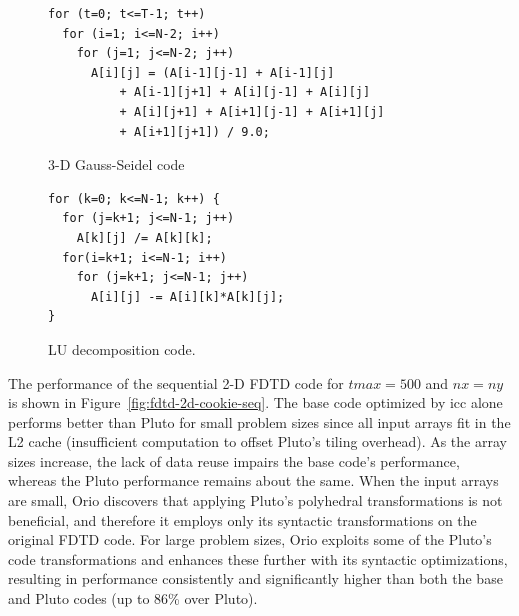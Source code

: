 \begin{figure}%
\begin{center}
\begin{minipage}{3in} 
\scriptsize
\begin{verbatim} 
for (t=0; t<=T-1; t++) 
  for (i=1; i<=N-2; i++) 
    for (j=1; j<=N-2; j++) 
      A[i][j] = (A[i-1][j-1] + A[i-1][j] 
          + A[i-1][j+1] + A[i][j-1] + A[i][j] 
          + A[i][j+1] + A[i+1][j-1] + A[i+1][j] 
          + A[i+1][j+1]) / 9.0; 
\end{verbatim} 
\end{minipage} 
\end{center}
\caption{3-D Gauss-Seidel code} 
\label{fig:seidel-code} 
\end{figure}

\begin{figure}%
\begin{center}
\begin{minipage}{2.8in} 
\scriptsize
\begin{verbatim} 
for (k=0; k<=N-1; k++) { 
  for (j=k+1; j<=N-1; j++) 
    A[k][j] /= A[k][k]; 
  for(i=k+1; i<=N-1; i++) 
    for (j=k+1; j<=N-1; j++) 
      A[i][j] -= A[i][k]*A[k][j]; 
} 
\end{verbatim} 
\end{minipage} 
\end{center}
\caption{LU decomposition code.} 
\label{fig:lu-code} 
\end{figure}


The performance of the sequential 2-D FDTD code for $tmax=500$ and $nx=ny$ is
shown in Figure~\ref{fig:fdtd-2d-cookie-seq}. The base code optimized by icc
alone performs better than Pluto for small problem sizes since all input
arrays fit in the L2 cache (insufficient computation to offset Pluto's tiling
overhead). As the array sizes increase, the lack of data reuse impairs the
base code's performance, whereas the Pluto performance remains about the
same.
When the input arrays are small, Orio discovers that applying
Pluto's polyhedral transformations is not beneficial, and therefore
it employs only its syntactic transformations on the original FDTD
code. For large problem sizes, Orio exploits some of the Pluto's code
transformations and enhances these further with its syntactic
optimizations, resulting in performance consistently and significantly
higher than both the base and Pluto codes (up to 86\% over Pluto).


